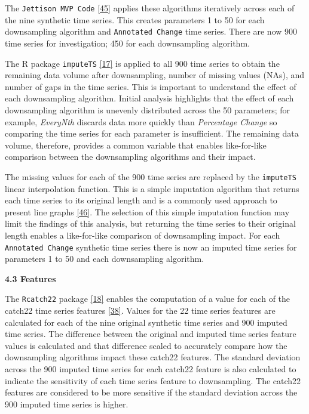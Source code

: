 \documentclass{article}
\begin{document}
The \texttt{Jettison\ MVP\ Code}
\protect\hyperlink{ref-Jettison}{{[}45{]}} applies these algorithms
iteratively across each of the nine synthetic time series. This creates
parameters 1 to 50 for each downsampling algorithm and
\texttt{Annotated\ Change} time series. There are now 900 time series
for investigation; 450 for each downsampling algorithm.

The R package \texttt{imputeTS}
\protect\hyperlink{ref-imputeTS_R}{{[}17{]}} is applied to all 900 time
series to obtain the remaining data volume after downsampling, number of
missing values (NAs), and number of gaps in the time series. This is
important to understand the effect of each downsampling algorithm.
Initial analysis highlights that the effect of each downsampling
algorithm is unevenly distributed across the 50 parameters; for example,
\emph{EveryNth} discards data more quickly than \emph{Percentage Change}
so comparing the time series for each parameter is insufficient. The
remaining data volume, therefore, provides a common variable that
enables like-for-like comparison between the downsampling algorithms and
their impact.

The missing values for each of the 900 time series are replaced by the
\texttt{imputeTS} linear interpolation function. This is a simple
imputation algorithm that returns each time series to its original
length and is a commonly used approach to present line graphs
\protect\hyperlink{ref-compressiontech}{{[}46{]}}. The selection of this
simple imputation function may limit the findings of this analysis, but
returning the time series to their original length enables a
like-for-like comparison of downsampling impact. For each
\texttt{Annotated\ Change} synthetic time series there is now an imputed
time series for parameters 1 to 50 and each downsampling algorithm.

\textbf{4.3 Features}

The \texttt{Rcatch22} package
\protect\hyperlink{ref-catch22_R}{{[}18{]}} enables the computation of a
value for each of the catch22 time series features
\protect\hyperlink{ref-catch22}{{[}38{]}}. Values for the 22 time series
features are calculated for each of the nine original synthetic time
series and 900 imputed time series. The difference between the original
and imputed time series feature values is calculated and that difference
scaled to accurately compare how the downsampling algorithms impact
these catch22 features. The standard deviation across the 900 imputed
time series for each catch22 feature is also calculated to indicate the
sensitivity of each time series feature to downsampling. The catch22
features are considered to be more sensitive if the standard deviation
across the 900 imputed time series is higher.
\end{document}
